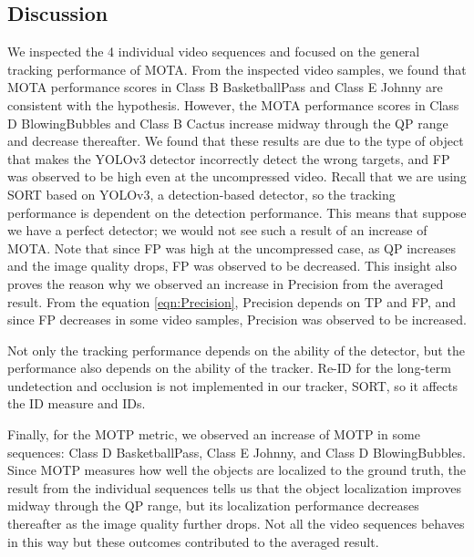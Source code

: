 \subsection{Discussion}
We inspected the 4 individual video sequences and focused on the general tracking performance of MOTA. From the inspected video samples, we found that MOTA performance scores in Class B BasketballPass and Class E Johnny are consistent with the hypothesis. However, the MOTA performance scores in Class D BlowingBubbles and Class B Cactus increase midway through the QP range and decrease thereafter. We found that these results are due to the type of object that makes the YOLOv3 detector incorrectly detect the wrong targets, and FP was observed to be high even at the uncompressed video. Recall that we are using SORT based on YOLOv3, a detection-based detector, so the tracking performance is dependent on the detection performance. This means that suppose we have a perfect detector; we would not see such a result of an increase of MOTA. Note that since FP was high at the uncompressed case, as QP increases and the image quality drops, FP was observed to be decreased. This insight also proves the reason why we observed an increase in Precision from the averaged result. From the equation \ref{eqn:Precision}, Precision depends on TP and FP, and since FP decreases in some video samples, Precision was observed to be increased.

Not only the tracking performance depends on the ability of the detector, but the performance also depends on the ability of the tracker. Re-ID for the long-term undetection and occlusion is not implemented in our tracker, SORT, so it affects the ID measure and IDs.

Finally, for the MOTP metric, we observed an increase of MOTP in some sequences: Class D BasketballPass, Class E Johnny, and Class D BlowingBubbles. Since MOTP measures how well the objects are localized to the ground truth, the result from the individual sequences tells us that the object localization improves midway through the QP range, but its localization performance decreases thereafter as the image quality further drops. Not all the video sequences behaves in this way but these outcomes contributed to the averaged result.